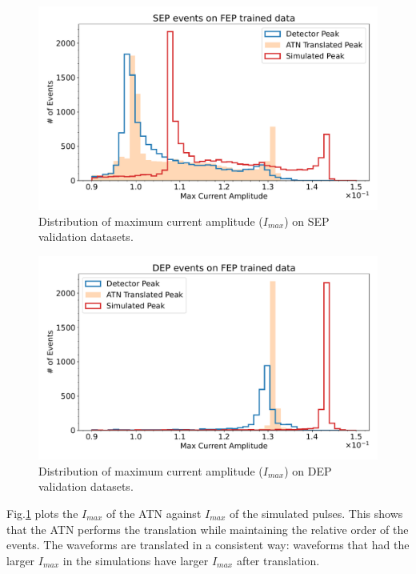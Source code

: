 \begin{figure}%
\centering
\includegraphics[width=0.9\linewidth,trim={0pc 0pc 0pc 0pc},clip]{ch8/figs/SEP_amp.pdf}
\caption{ Distribution of maximum current amplitude ($I_{max}$) on SEP validation datasets.}
\label{ch8_fig_current_amp_sep}
\end{figure}

\begin{figure}%
\centering
\includegraphics[width=0.9\linewidth,trim={0pc 0pc 0pc 0pc},clip]{ch8/figs/DEP_amp.pdf}
\caption{ Distribution of maximum current amplitude ($I_{max}$) on DEP validation datasets.}
\label{ch8_fig_current_amp_dep}
\end{figure}


Fig.\ref{ch8_fig_current_amp_sep} plots the $I_{max}$ of the ATN against $I_{max}$ of the simulated pulses. This shows that the ATN performs the translation while maintaining the relative order of the events. The waveforms are translated in a consistent way: waveforms that had the larger $I_{max}$ in the simulations have larger $I_{max}$ after translation.

